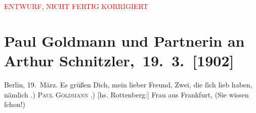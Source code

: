 
\begin{center}
            \textcolor{red}{ENTWURF, NICHT FERTIG KORRIGIERT}
                      \end{center}
            
         \renewcommand{\erwaehnteOrte}{Orte: Berlin, Frankfurt am Main, Hinterbrühl}
         \renewcommand{\erwaehnteWerke}{}
               \section[ Paul Goldmann und Partnerin an Arthur Schnitzler, 19. 3. {[}1902{]}]{ Paul Goldmann und Partnerin an Arthur Schnitzler, 19. 3. {[}1902{]}}\nopagebreak{}\rehead{ }\begin{ledgroupsized}[t]{13cm}\normalsize\beginnumbering \toendnotes[C]{\smallbreak\pagebreak[2]} 
\pstart
           \raggedleft{}{\pb}Berlin, 19. März.\pend
           \pstart
           Es grüßen Dich, mein lieber Freund, Zwei, die ſich lieb haben, nämlich\pend
           .) \textsc{Paul Goldmann}\pend
           .) {[}hs. Rottenberg:{]} Frau {\dotsfour} aus Frankfurt, (Sie wissen ſchon!)\pend
           
         
         \endnumbering{}\end{ledgroupsized}\begin{anhang}\end{anhang}\newcommand{\dateiname}{L03199}\newcommand{\titel}{Paul Goldmann und Partnerin an Arthur Schnitzler, 19. 3. [1902]}\newcommand{\editorInnen}{Martin Anton Müller und Laura Untner}
      